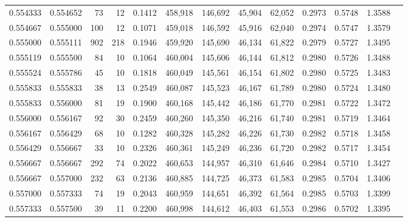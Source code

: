 \begin{tabular}{rrrrrrrrrrrrr}
0.554333 & 0.554652 &    73 &  12 &                                     0.1412 & 458,918 & 146,692 &  45,904 &  62,052 & 0.2973 & 0.5748 & 1.3588 \\
0.554667 & 0.555000 &   100 &  12 &                                     0.1071 & 459,018 & 146,592 &  45,916 &  62,040 & 0.2974 & 0.5747 & 1.3579 \\
0.555000 & 0.555111 &   902 & 218 &                                     0.1946 & 459,920 & 145,690 &  46,134 &  61,822 & 0.2979 & 0.5727 & 1.3495 \\
0.555119 & 0.555500 &    84 &  10 &                                     0.1064 & 460,004 & 145,606 &  46,144 &  61,812 & 0.2980 & 0.5726 & 1.3488 \\
0.555524 & 0.555786 &    45 &  10 &                                     0.1818 & 460,049 & 145,561 &  46,154 &  61,802 & 0.2980 & 0.5725 & 1.3483 \\
0.555833 & 0.555833 &    38 &  13 &                                     0.2549 & 460,087 & 145,523 &  46,167 &  61,789 & 0.2980 & 0.5724 & 1.3480 \\
0.555833 & 0.556000 &    81 &  19 &                                     0.1900 & 460,168 & 145,442 &  46,186 &  61,770 & 0.2981 & 0.5722 & 1.3472 \\
0.556000 & 0.556167 &    92 &  30 &                                     0.2459 & 460,260 & 145,350 &  46,216 &  61,740 & 0.2981 & 0.5719 & 1.3464 \\
0.556167 & 0.556429 &    68 &  10 &                                     0.1282 & 460,328 & 145,282 &  46,226 &  61,730 & 0.2982 & 0.5718 & 1.3458 \\
0.556429 & 0.556667 &    33 &  10 &                                     0.2326 & 460,361 & 145,249 &  46,236 &  61,720 & 0.2982 & 0.5717 & 1.3454 \\
0.556667 & 0.556667 &   292 &  74 &                                     0.2022 & 460,653 & 144,957 &  46,310 &  61,646 & 0.2984 & 0.5710 & 1.3427 \\
0.556667 & 0.557000 &   232 &  63 &                                     0.2136 & 460,885 & 144,725 &  46,373 &  61,583 & 0.2985 & 0.5704 & 1.3406 \\
0.557000 & 0.557333 &    74 &  19 &                                     0.2043 & 460,959 & 144,651 &  46,392 &  61,564 & 0.2985 & 0.5703 & 1.3399 \\
0.557333 & 0.557500 &    39 &  11 &                                     0.2200 & 460,998 & 144,612 &  46,403 &  61,553 & 0.2986 & 0.5702 & 1.3395 \\

\end{tabular}
